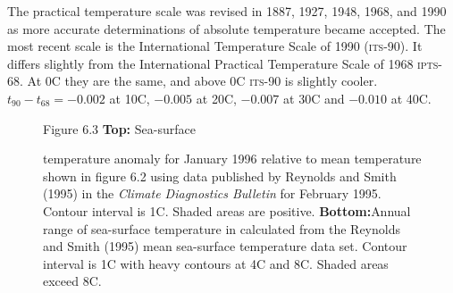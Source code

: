 The practical temperature scale was revised in 1887, 1927, 1948, 1968,
and 1990 as more accurate determinations of absolute temperature
became accepted. The most recent scale is the International
Temperature Scale of 1990
(\textsc{its}-90). It differs slightly from the International Practical
Temperature Scale of 1968 \textsc{ipts}-68. At 0\degrees C they are
the same, and above 0\degrees C \textsc{its}-90 is slightly
cooler. $t_{90}-t_{68} = -0.002$ at 10\degrees C, $-0.005$ at
20\degrees C, $-0.007$ at 30\degrees C and $-0.010$ at 40\degrees C.

\begin{figure}[b!]
\vspace{-3ex}
\footnotesize
Figure 6.3 \textbf{Top:} Sea-surface \rule{0mm}{3ex}temperature
anomaly for January 1996 relative to mean temperature shown in figure
6.2 using data published by Reynolds and Smith (1995) in the
\textit{Climate Diagnostics Bulletin} for February 1995. Contour
interval is 1\degrees C. Shaded areas are
positive. \textbf{Bottom:}Annual range of sea-surface temperature in
 calculated from the Reynolds and Smith (1995) mean
sea-surface temperature data set. Contour interval is 1\degrees C with
heavy contours at 4\degrees C and 8\degrees C. Shaded areas exceed
8\degrees C.
\label{fig:SSTvariability}
\end{figure}

